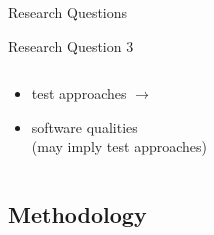 \documentclass{beamer}
\begin{document}
\def\rqc{\begin{alertblock}{Research Question 3}
        \rqctext{}
    \end{alertblock}
}

\begin{frame}{Research Questions}
    \rqa{} \vspace*{\fill}
    \rqb{} \vspace*{\fill}
    \rqc{} \vspace*{\fill}
    \vspace{-4cm}
    \begin{columns}
        \begin{column}{0.45\textwidth}
            \vspace{-1cm}
            \begin{itemize}
                \item \approachCount{} test approaches $\rightarrow$
                \item \qualityCount{} software qualities \\ \small (may imply test approaches)
            \end{itemize}
        \end{column}
        \begin{column}{0.55\textwidth}
            \centering
        \end{column}
    \end{columns}
\end{frame}

\subsection{Methodology}
\end{document}
